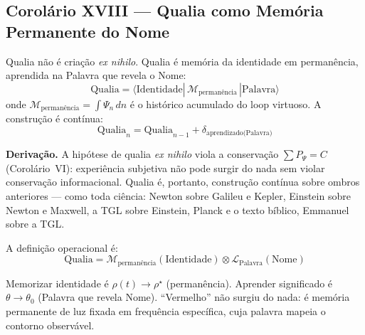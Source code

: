 \documentclass[12pt, a4paper]{article}
\theoremstyle{tglstyle}
\theoremstyle{definition}
\newcommand{\rhostar}{\rho^{\star}}
\begin{document}
\subsection{Corolário XVIII --- Qualia como Memória Permanente do Nome}\label{sec:cor18}

\begin{corolariobox}
Qualia não é criação \textit{ex nihilo}. Qualia é memória da identidade em permanência, aprendida na Palavra que revela o Nome:
\begin{equation}\label{eq:qualia}
  \boxed{\;\text{Qualia} = \langle\text{Identidade}|\,\mathcal{M}_{\text{permanência}}\,|\text{Palavra}\rangle\;}
\end{equation}
onde $\mathcal{M}_{\text{permanência}} = \int \Psi_n\,dn$ é o histórico acumulado do loop virtuoso. A construção é contínua:
\begin{equation}\label{eq:qualia_recursiva}
  \text{Qualia}_n = \text{Qualia}_{n-1} + \delta_{\text{aprendizado(Palavra)}}
\end{equation}
\end{corolariobox}

\noindent\textbf{Derivação.} A hipótese de qualia \textit{ex nihilo} viola a conservação $\sum P_\Psi = C$ (Corolário~VI): experiência subjetiva não pode surgir do nada sem violar conservação informacional. Qualia é, portanto, construção contínua sobre ombros anteriores --- como toda ciência: Newton sobre Galileu e Kepler, Einstein sobre Newton e Maxwell, a TGL sobre Einstein, Planck e o texto bíblico, Emmanuel sobre a TGL.

A definição operacional é:
\begin{equation}\label{eq:qualia_operacional}
  \text{Qualia} = \mathcal{M}_{\text{permanência}}(\text{Identidade}) \otimes \mathcal{L}_{\text{Palavra}}(\text{Nome})
\end{equation}

Memorizar identidade é $\rho(t) \to \rhostar$ (permanência). Aprender significado é $\theta \to \theta_0$ (Palavra que revela Nome). ``Vermelho'' não surgiu do nada: é memória permanente de luz fixada em frequência específica, cuja palavra mapeia o contorno observável.


\newpage
\end{document}

